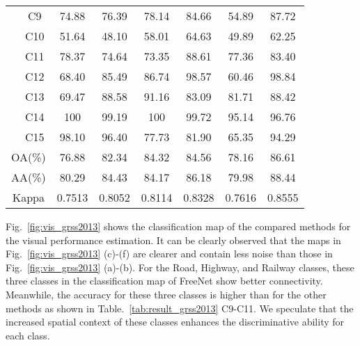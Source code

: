 \documentclass[journal]{IEEEtran}
\begin{document}
\begin{table}[h]
{\begin{tabular}{c|c|ccccc|c}
                                                     & C9                               & 74.88                          & 76.39     & 78.14  & 84.66 & 54.89 & 87.72 \\
                                                     & C10                              & 51.64                          & 48.10     & 58.01  & 64.63 & 49.89 & 62.25 \\
                                                     & C11                              & 78.37                          & 74.64     & 73.35  & 88.61 & 77.36 & 83.40 \\
                                                     & C12                              & 68.40                          & 85.49     & 86.74  & 98.57 & 60.46 & 98.84 \\
                                                     & C13                              & 69.47                          & 88.58     & 91.16  & 83.09 & 81.71 & 88.42 \\
                                                     & C14                              & 100                            & 99.19     & 100    & 99.72 & 95.14 & 96.76 \\
                                                     & C15                              & 98.10                          & 96.40     & 77.73  & 81.90 & 65.35  & 94.29 \\ \hline
      \multicolumn{2}{c|}{OA(\%)}                    & 76.88                            & 82.34                          & 84.32     & 84.56 & 78.16 & 86.61           \\
      \multicolumn{2}{c|}{AA(\%)}                    & 80.29                            & 84.43                          & 84.17     & 86.18  & 79.98 & 88.44           \\
      \multicolumn{2}{c|}{Kappa}                     & 0.7513                           & 0.8052                         & 0.8114    & 0.8328 & 0.7616 & 0.8555          \\ \hline
    \end{tabular}
  }
\end{table}



Fig.~\ref{fig:vis_grss2013} shows the classification map of the compared methods for the visual performance estimation.
It can be clearly observed that the maps in Fig.~\ref{fig:vis_grss2013} (c)-(f) are clearer and contain less noise than those in Fig.~\ref{fig:vis_grss2013} (a)-(b).
For the Road, Highway, and Railway classes, these three classes in the classification map of FreeNet show better connectivity.
Meanwhile, the accuracy for these three classes is higher than for the other methods as shown in Table.~\ref{tab:result_grss2013} C9-C11.
We speculate that the increased spatial context of these classes enhances the discriminative ability for each class.
\end{document}
